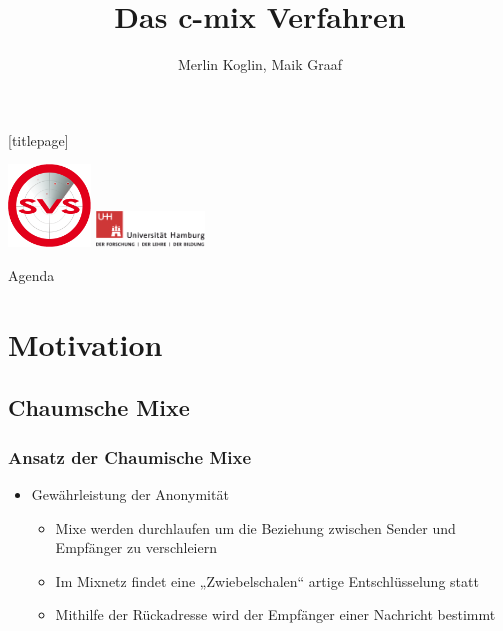 \documentclass[t, xcolor=dvipsnames]{beamer}
\title{Das c-mix Verfahren }
\author[Merlin Koglin, Maik Graaf]{Merlin Koglin, Maik Graaf}
\date{}
\begin{document}
\begingroup
	[titlepage]
	\begin{frame}[plain]
		\vskip8mm
		\includegraphics[width=2.2cm]{pic/svs_logo_uhhred.png}
		\titlepage
		\vspace{\fill}
		\includegraphics[width=2.9cm]{pic/UHH-Logo_2010_Farbe_RGB_hires_nomargin.png}
		\vskip20pt
	\end{frame}
\endgroup

\begin{frame}{Agenda}
	\tableofcontents
\end{frame}

\section{Motivation} %

\subsection{Chaumsche Mixe} %
\begin{frame}
	\frametitle{Ansatz der Chaumische Mixe}
	\begin{itemize}
		\item Gewährleistung der Anonymität
			\begin{itemize}
				\item Mixe werden durchlaufen um die Beziehung zwischen Sender und Empfänger zu verschleiern
		        \item Im Mixnetz findet eine „Zwiebelschalen“ artige Entschlüsselung statt
		        \item Mithilfe der Rückadresse wird der Empfänger einer Nachricht bestimmt
			\end{itemize}
	\end{itemize}
	\vspace{\fill}
\end{frame}
\end{document}
